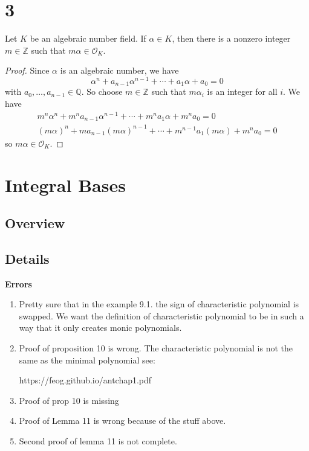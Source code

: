 \chapter{3}

\begin{example}
    Let \(K\) be an algebraic number field. If \(\alpha \in K\), then there is a nonzero integer \(m \in \mathbb{Z}\) such that \(m \alpha \in \mathcal{O}_K\).
\end{example}
\begin{proof}
    Since \(\alpha\) is an algebraic number, we have
    \begin{equation*}
        \alpha^n + a_{n-1} \alpha^{n-1} + \cdots + a_1 \alpha + a_0 = 0
    \end{equation*}
    with \(a_0, \ldots, a_{n-1} \in \mathbb{Q}\). So choose \(m \in \mathbb{Z}\) such that \(m \alpha_i\) is an integer for all \(i\). We have
    \begin{align*}
        m^n \alpha^n + m^n a_{n-1} \alpha^{n-1} + \cdots + m^n a_1 \alpha + m^n a_0 = 0 \\
        (m \alpha)^n + m a_{n-1} (m \alpha)^{n-1} + \cdots + m^{n-1} a_1 (m \alpha) + m^n a_0 = 0
    \end{align*}
    so \(m \alpha \in \mathcal{O}_K\).
\end{proof}

\chapter{Integral Bases}

\section{Overview}

\section{Details}

{\color{red}\textbf{Errors}}
\begin{enumerate}
    \item Pretty sure that in the example 9.1. the sign of characteristic polynomial is swapped. We want the definition of characteristic polynomial to be in such a way that it only creates monic polynomials.
    \item Proof of proposition 10 is wrong. The characteristic polynomial is not the same as the minimal polynomial see:
    
    https://feog.github.io/antchap1.pdf

    \item Proof of prop 10 is missing
    \item Proof of Lemma 11 is wrong because of the stuff above.
    \item Second proof of lemma 11 is not complete.
\end{enumerate}

